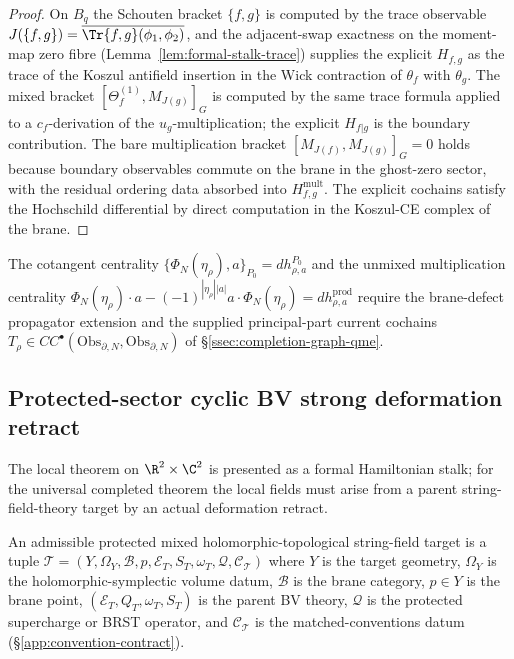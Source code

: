 \begin{proof}
On \(B_q\) the Schouten bracket
\(\{f,g\}\) is computed by the trace observable
\(J(\{f,g\})=\overline{\Tr\{f,g\}(\phi_1,\phi_2)}\), and the
adjacent-swap exactness on the moment-map zero fibre
(Lemma~\ref{lem:formal-stalk-trace}) supplies the explicit
\(H_{f,g}\) as the trace of the Koszul antifield insertion in the
Wick contraction of \(\theta_f\) with \(\theta_g\).  The mixed
bracket \([\Theta^{(1)}_f,M_{J(g)}]_G\) is computed by the same
trace formula applied to a \(c_f\)-derivation of the
\(u_g\)-multiplication; the explicit \(H_{f|g}\) is the boundary
contribution.  The bare multiplication bracket
\([M_{J(f)},M_{J(g)}]_G=0\) holds because boundary observables
commute on the brane in the ghost-zero sector, with the residual
ordering data absorbed into \(H^{\mathrm{mult}}_{f,g}\).  The
explicit cochains satisfy the Hochschild differential by direct
computation in the Koszul-CE complex of the brane.
\end{proof}

\begin{rmk}
\label{rmk:completion-cotangent-centrality}
The cotangent centrality
\(\{\Phi_N(\eta_\rho),a\}_{P_0}=dh^{P_0}_{\rho,a}\) and the
unmixed multiplication centrality
\(\Phi_N(\eta_\rho)\cdot a-(-1)^{|\eta_\rho||a|}a\cdot\Phi_N(\eta_\rho)
=dh^{\mathrm{prod}}_{\rho,a}\) require the brane-defect propagator
extension and the supplied principal-part current cochains
\(T_\rho\in CC^\bullet(\mathrm{Obs}_{\partial,N},\mathrm{Obs}_{\partial,N})\)
of \S\ref{ssec:completion-graph-qme}.
\end{rmk}

\subsection{Protected-sector cyclic BV strong deformation retract}
\label{ssec:completion-protected-sector-sdr}

The local theorem on \(\R^2\times\C^2\) is presented as a formal
Hamiltonian stalk; for the universal completed theorem the local
fields must arise from a parent string-field-theory target by an
actual deformation retract.

\begin{defn}
\label{def:completion-admissible-protected-target}
An admissible protected mixed holomorphic-topological string-field
target is a tuple
\(\mathcal T=(Y,\Omega_Y,\mathcal B,p,\mathcal E_T,S_T,\omega_T,
\mathcal Q,\mathcal C_{\mathcal T})\) where \(Y\) is the target
geometry, \(\Omega_Y\) is the holomorphic-symplectic volume datum,
\(\mathcal B\) is the brane category, \(p\in Y\) is the brane
point, \((\mathcal E_T,Q_T,\omega_T,S_T)\) is the parent BV
theory, \(\mathcal Q\) is the protected supercharge or BRST
operator, and \(\mathcal C_{\mathcal T}\) is the matched-conventions
datum (\S\ref{app:convention-contract}).
\end{defn}

